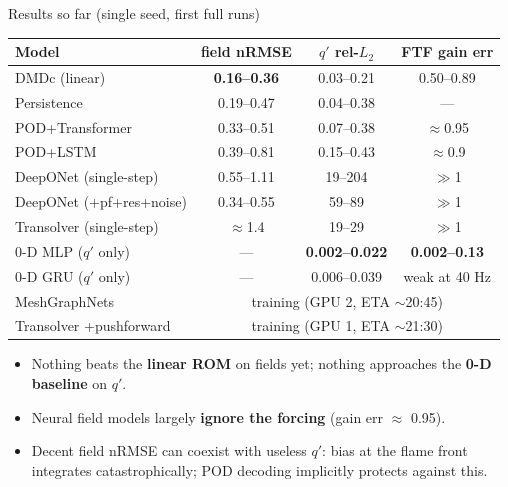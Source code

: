 \documentclass[10pt]{beamer}
\begin{document}
\begin{frame}{Results so far (single seed, first full runs)}
  \centering
  \begin{tabular}{lccc}
    \toprule
    Model & field nRMSE & $q'$ rel-$L_2$ & FTF gain err \\
    \midrule
    DMDc (linear)            & \textbf{0.16--0.36} & 0.03--0.21 & 0.50--0.89 \\
    Persistence              & 0.19--0.47 & 0.04--0.38 & --- \\
    POD+Transformer          & 0.33--0.51 & 0.07--0.38 & $\approx$0.95 \\
    POD+LSTM                 & 0.39--0.81 & 0.15--0.43 & $\approx$0.9 \\
    DeepONet (single-step)   & 0.55--1.11 & 19--204 & $\gg$1 \\
    DeepONet (+pf+res+noise) & 0.34--0.55 & 59--89 & $\gg$1 \\
    Transolver (single-step) & $\approx$1.4 & 19--29 & $\gg$1 \\
    0-D MLP ($q'$ only)      & --- & \textbf{0.002--0.022} & \textbf{0.002--0.13} \\
    0-D GRU ($q'$ only)      & --- & 0.006--0.039 & weak at 40 Hz \\
    \alert{MeshGraphNets}    & \multicolumn{3}{c}{\alert{training (GPU 2, ETA $\sim$20:45)}} \\
    \alert{Transolver +pushforward} & \multicolumn{3}{c}{\alert{training (GPU 1, ETA $\sim$21:30)}} \\
    \bottomrule
  \end{tabular}
  \vspace{0.5em}
  \begin{itemize}
    \item Nothing beats the \textbf{linear ROM} on fields yet; nothing approaches the
          \textbf{0-D baseline} on $q'$.
    \item Neural field models largely \textbf{ignore the forcing} (gain err $\approx$ 0.95).
    \item Decent field nRMSE can coexist with useless $q'$: bias at the flame front
          integrates catastrophically; POD decoding implicitly protects against this.
  \end{itemize}
\end{frame}
\end{document}
